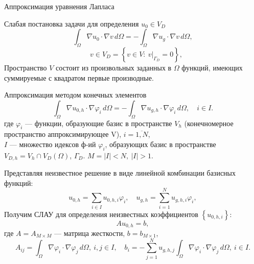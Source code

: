 \documentclass[ignoreonframetext,xcolor=table, unicode, 10pt]{beamer}
\renewcommand{\phi}{\varphi}
\begin{document}
\begin{frame}{Аппроксимация уравнения Лапласа}
		\hspace*{-2mm}
		\begin{block}{Слабая постановка задачи для определения $u_0 \in V_D$}
			\begin{equation*}
				\int_{\Omega} \nabla u_0 \cdot \nabla v \, d\Omega = 
				- \int_{\Omega} \nabla u_g \cdot \nabla v \, d\Omega,
			\end{equation*}	
			\begin{equation*}
				\quad v \in V_D = \left\{ v \in V: \ v |_{\Gamma_D} = 0 \right\},
			\end{equation*}
			Пространство $V$ состоит из произвольных заданных в $\Omega$ функций, имеющих суммируемые с квадратом первые производные.
		\end{block}
		
		
	
	
	\normalsize
\end{frame}

\begin{frame}{}
		
		
		\begin{block}{Аппроксимация методом конечных элементов}
			\begin{equation*}
				\int_{\Omega} \nabla u_{0,h} \cdot \nabla \phi_{i} \, d\Omega = 
				- \int_{\Omega} \nabla u_{g,h} \cdot \nabla \phi_{i} \, d\Omega, \quad i \in I. 
			\end{equation*}
			где $\phi_i$ --- функции, образующие базис в пространстве $V_h$ (конечномерное пространство аппроксимирующее V), $ i = \overline{1, N}$,\\
			$I$ --- множество идексов ф-ий $\phi_i$, образующих базис в пространстве 
			$V_{D,h} = V_h \cap V_D(\Omega)$, $\Gamma_D$. $M = |I| < N,\ |I| > 1.$
		\end{block}
		Представляя неизвестное решение в виде линейной комбинации базисных функций:		
		\vspace*{-5mm}
		\begin{equation*}
			u_{0,h} = \sum_{i \in I} u_{0,h,i} \phi_i, \quad 
			u_{g,h} = \sum_{i = 1}^{N} u_{g,h,i} \phi_i, 
		\end{equation*}		
		Получим СЛАУ для определения неизвестных коэффициентов $\left\{u_{0, h, i}\right\}$:
		\begin{equation}
			A u_{0,h} = b,
			\label{SLE}
		\end{equation}
		где $A = A_{M \times M}$ --- матрица жесткости, $b = b_{M \times 1}$,
		\begin{equation*}
			A_{ij} = \int_{\Omega} \nabla \phi_i \cdot \nabla \phi_j \, d\Omega,
			\ i, j\in I,
			\quad
			b_i = - \sum_{j=1}^{N} u_{g,h, j} \int_{\Omega} \nabla \phi_i  \cdot \nabla \phi_j \, d\Omega, \  i \in I.
		\end{equation*}
	\normalsize
\end{frame}
\end{document}
